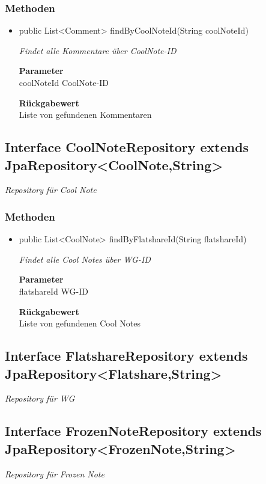 \documentclass[a4paper]{scrreprt}
\begin{document}
        \subsubsection{Methoden}
        \begin{itemize}
        	\item{public List<Comment> findByCoolNoteId(String coolNoteId)}
        	
        	\textit{Findet alle Kommentare über CoolNote-ID}
        	
        	\textbf{Parameter} \\
        	coolNoteId CoolNote-ID
        	
        	\textbf{Rückgabewert} \\
        	Liste von gefundenen Kommentaren
        \end{itemize}
        \subsection{Interface CoolNoteRepository extends JpaRepository<CoolNote,String>}
        \textit{Repository für Cool Note}
        \subsubsection{Methoden}
        \begin{itemize}
        	\item{public List<CoolNote> findByFlatshareId(String flatshareId)}
        	
        	\textit{Findet alle Cool Notes über WG-ID}
        	
        	\textbf{Parameter} \\
        	flatshareId WG-ID
        	
        	\textbf{Rückgabewert} \\
        	Liste von gefundenen Cool Notes
        \end{itemize}
        \subsection{Interface FlatshareRepository extends JpaRepository<Flatshare,String>}
        \textit{Repository für WG}
        \subsection{Interface FrozenNoteRepository extends JpaRepository<FrozenNote,String>}
        \textit{Repository für Frozen Note}
\end{document}
